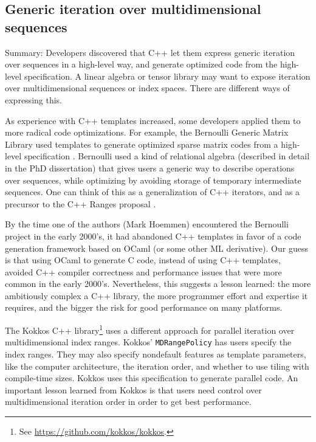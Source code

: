 \subsection{Generic iteration over multidimensional sequences}
\label{SS:features:iteration}

Summary: Developers discovered that C++ let them express generic
iteration over sequences in a high-level way, and generate optimized
code from the high-level specification.  A linear algebra or tensor
library may want to expose iteration over multidimensional sequences
or index spaces.  There are different ways of expressing this.

As experience with C++ templates increased, some developers applied
them to more radical code optimizations.  For example, the Bernoulli
Generic Matrix Library used templates to generate optimized sparse
matrix codes from a high-level specification \cite{Ahmed2000}.
Bernoulli used a kind of relational algebra (described in detail in
the PhD dissertation) that gives users a generic way to describe
operations over sequences, while optimizing by avoiding storage of
temporary intermediate sequences.  One can think of this as a
generalization of C++ iterators, and as a precursor to the C++ Ranges
proposal \cite{Niebler2018}.

By the time one of the authors (Mark Hoemmen) encountered the
Bernoulli project in the early 2000's, it had abandoned C++ templates
in favor of a code generation framework based on OCaml (or some other
ML derivative).  Our guess is that using OCaml to generate C code,
instead of using C++ templates, avoided C++ compiler correctness and
performance issues that were more common in the early 2000's.
Nevertheless, this suggests a lesson learned: the more ambitiously
complex a C++ library, the more programmer effort and expertise it
requires, and the bigger the risk for good performance on many
platforms.

The Kokkos C++ library\footnote{See
  \url{https://github.com/kokkos/kokkos}.} uses a different approach
for parallel iteration over multidimensional index ranges.  Kokkos'
\texttt{MDRangePolicy} has users specify the index ranges.  They may
also specify nondefault features as template parameters, like the
computer architecture, the iteration order, and whether to use tiling
with compile-time sizes.  Kokkos uses this specification to generate
parallel code.  An important lesson learned from Kokkos is that users
need control over multidimensional iteration order in order to get
best performance.

